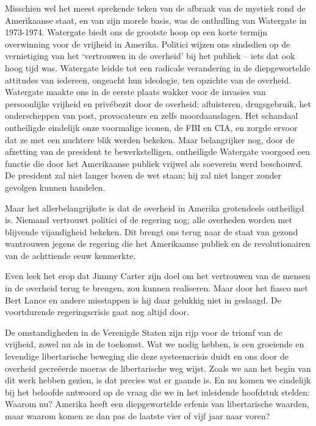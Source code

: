 \documentclass[
  a5paper,
  smalldemyvopaper,10pt,twoside,onecolumn,openright,extrafontsizes,hidelinks]{memoir}
\begin{document}
Misschien wel het meest sprekende teken van de afbraak van de mystiek
rond de Amerikaanse staat, en van zijn morele basis, was de onthulling
van Watergate in 1973-1974. Watergate biedt ons de grootste hoop op een
korte termijn overwinning voor de vrijheid in Amerika. Politici wijzen
ons sindsdien op de vernietiging van het `vertrouwen in de overheid' bij
het publiek -- iets dat ook hoog tijd was. Watergate leidde tot een
radicale verandering in de diepgewortelde attitudes van iedereen,
ongeacht hun ideologie, ten opzichte van de overheid. Watergate maakte
ons in de eerste plaats wakker voor de invasies van persoonlijke
vrijheid en privébezit door de overheid: afluisteren, drugsgebruik, het
onderscheppen van post, provocateurs en zelfs moordaanslagen. Het
schandaal ontheiligde eindelijk onze voormalige iconen, de FBI en CIA,
en zorgde ervoor dat ze met een nuchtere blik werden bekeken. Maar
belangrijker nog, door de afzetting van de president te bewerkstelligen,
ontheiligde Watergate voorgoed een functie die door het Amerikaanse
publiek vrijwel als soeverein werd beschouwd. De president zal niet
langer boven de wet staan; hij zal niet langer zonder gevolgen kunnen
handelen.

Maar het allerbelangrijkste is dat de overheid in Amerika grotendeels
ontheiligd is. Niemand vertrouwt politici of de regering nog; alle
overheden worden met blijvende vijandigheid bekeken. Dit brengt ons
terug naar de staat van gezond wantrouwen jegens de regering die het
Amerikaanse publiek en de revolutionairen van de achttiende eeuw
kenmerkte.

Even leek het erop dat Jimmy Carter zijn doel om het vertrouwen van de
mensen in de overheid terug te brengen, zou kunnen realiseren. Maar door
het fiasco met Bert Lance en andere misstappen is hij daar gelukkig niet
in geslaagd. De voortdurende regeringscrisis gaat nog altijd door.

De omstandigheden in de Verenigde Staten zijn rijp voor de triomf van de
vrijheid, zowel nu als in de toekomst. Wat we nodig hebben, is een
groeiende en levendige libertarische beweging die deze systeemcrisis
duidt en ons door de overheid gecreëerde moeras de libertarische weg
wijst. Zoals we aan het begin van dit werk hebben gezien, is dat precies
wat er gaande is. En nu komen we eindelijk bij het beloofde antwoord op
de vraag die we in het inleidende hoofdstuk stelden: Waarom nu? Amerika
heeft een diepgewortelde erfenis van libertarische waarden, maar waarom
komen ze dan pas de laatste vier of vijf jaar naar voren?
\end{document}
